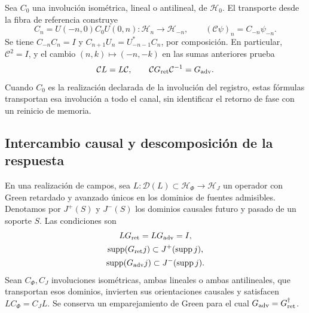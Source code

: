 Sea \(C_0\) una involución isométrica, lineal o antilineal, de
\(\mathcal H_0\). El transporte desde la fibra de referencia construye
\[
 C_n=U(-n,0)C_0U(0,n):\mathcal H_n\longrightarrow\mathcal H_{-n},
 \qquad (\mathcal C\psi)_n=C_{-n}\psi_{-n}.
\]
Se tiene \(C_{-n}C_n=I\) y
\(C_{n+1}U_n=U_{-n-1}^*C_n\), por composición.
En particular, \(\mathcal C^2=I\), y el cambio \((n,k)\mapsto(-n,-k)\)
en las sumas anteriores prueba
\begin{equation}
 \mathcal C L=L\mathcal C,\qquad
 \mathcal C G_{\rm ret}\mathcal C^{-1}=G_{\rm adv}.
 \label{vii:eq:intercambio-green-cronologico}
\end{equation}
Cuando \(C_0\) es la realización declarada de la involución del registro,
estas fórmulas transportan esa involución a todo el canal, sin identificar
el retorno de fase con un reinicio de memoria.

\subsection{Intercambio causal y descomposición de la respuesta}
\label{vii:subsec:green-realizacion-campos}

En una realización de campos, sea
\(L:\mathcal D(L)\subset\mathcal H_\Phi\to\mathcal H_J\)
un operador con Green retardado y avanzado únicos en los dominios de
fuentes admisibles. Denotamos por \(J^+(S)\) y \(J^-(S)\) los
dominios causales futuro y pasado de un soporte \(S\). Las condiciones son
\[
 \begin{gathered}
 LG_{\rm ret}=LG_{\rm adv}=I,\\
 \operatorname{supp}(G_{\rm ret}j)\subset J^+(\operatorname{supp}j),\\
 \operatorname{supp}(G_{\rm adv}j)\subset J^-(\operatorname{supp}j).
 \end{gathered}
\]
Sean \(C_\Phi,C_J\) involuciones isométricas, ambas lineales o ambas
antilineales, que transportan esos dominios,
invierten sus orientaciones causales y satisfacen
\(LC_\Phi=C_JL\). Se conserva un emparejamiento de Green para el cual
\(G_{\rm adv}=G_{\rm ret}^{\dagger}\).

